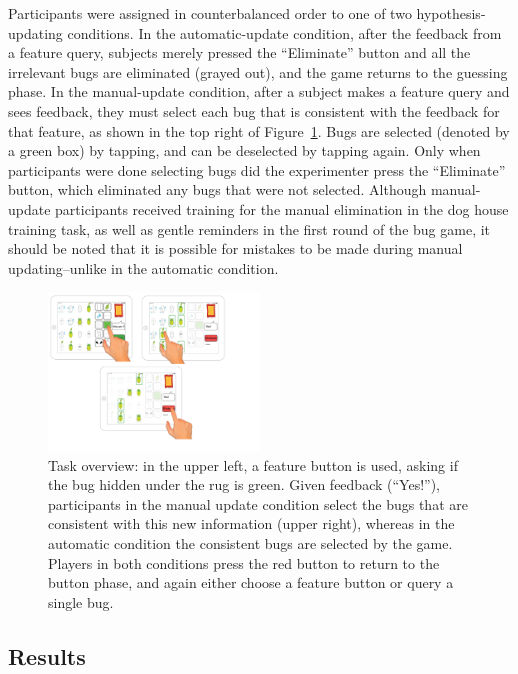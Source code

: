 \documentclass[10pt,letterpaper]{article}
\begin{document}
Participants were assigned in counterbalanced order to one of two hypothesis-updating conditions. In the automatic-update condition, after the feedback from a 
feature query, subjects merely pressed the ``Eliminate'' button and all the irrelevant bugs 
are eliminated (grayed out), and the game returns to the guessing phase. In the 
manual-update condition, after a subject makes a feature query and sees feedback, 
they must select each bug that is consistent with the feedback for that feature, as 
shown in the top right of Figure~\ref{fig:task-overview}. Bugs are selected (denoted by a green box) by 
tapping, and can be deselected by tapping again. Only when participants were done 
selecting bugs did the experimenter press the ``Eliminate'' button, which eliminated 
any bugs that were not selected. Although manual-update participants received 
training for the manual elimination in the dog house training task, as well as gentle 
reminders in the first round of the bug game, it should be noted that it is possible for 
mistakes to be made during manual updating--unlike in the automatic condition.


\begin{figure}[!h]
  \centering
  \includegraphics[width=0.5\textwidth]{figures/task_overview}
  \caption{Task overview: in the upper left, a feature button is used, asking if the bug 
hidden under the rug is green. Given feedback (``Yes!''), participants in the manual 
update condition select the bugs that are consistent with this new information (upper 
right), whereas in the automatic condition the consistent bugs are selected by the 
game. Players in both conditions press the red button to return to the button phase, 
and again either choose a feature button or query a single bug.}
  \label{fig:task-overview}
\end{figure} 

\vspace{-.3cm}
\subsection{Results}
\vspace{-.1cm}
\end{document}
